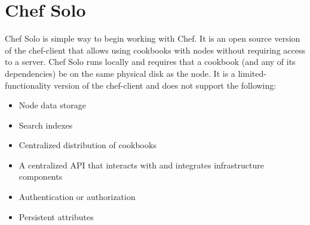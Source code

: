 \chapter{Chef Solo}

Chef Solo is simple way to begin working with Chef. It is an open source version of the chef-client that allows using cookbooks with nodes without requiring access to a server. Chef Solo runs locally and requires that a cookbook (and any of its dependencies) be on the same physical disk as the node. It is a limited-functionality version of the chef-client and does not support the following:

\begin{itemize}
  \item Node data storage
  \item Search indexes
  \item Centralized distribution of cookbooks
  \item A centralized API that interacts with and integrates infrastructure components
  \item Authentication or authorization
  \item Persistent attributes
\end{itemize}